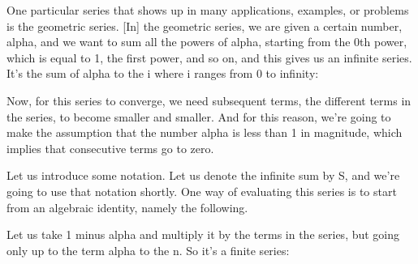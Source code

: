 \documentclass[pdftex, brazil, 12pt, twoside]{article}
\begin{document}
One particular series that shows up in many applications,
examples, or problems is the geometric series.
[In] the geometric series, we are given a certain number,
alpha, and we want to sum all the powers of alpha, starting
from the 0th power, which is equal to 1, the first power,
and so on, and this gives us an infinite series.
It's the sum of alpha to the i where i
ranges from 0 to infinity:

\begin{figure}[H]
  \begin{center}
  \end{center}
\end{figure}

Now, for this series to converge, we need subsequent
terms, the different terms in the series, to become smaller
and smaller.
And for this reason, we're going to make the assumption
that the number alpha is less than 1 in magnitude, which
implies that consecutive terms go to zero.

Let us introduce some notation.
Let us denote the infinite sum by S, and we're going to use
that notation shortly.
One way of evaluating this series is to start from an
algebraic identity, namely the following.

Let us take 1 minus alpha and multiply it by the terms in
the series, but going only up to the term alpha to the n.
So it's a finite series:

\begin{figure}[H]
  \begin{center}
  \end{center}
\end{figure}
\end{document}
